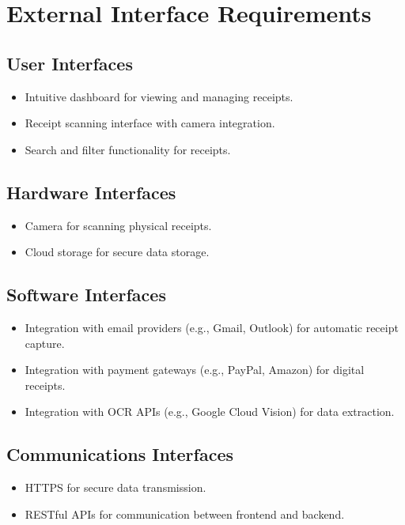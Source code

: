 \documentclass[12pt]{article}
\begin{document}
\section{External Interface Requirements}
\subsection{User Interfaces}
\begin{itemize}
    \item Intuitive dashboard for viewing and managing receipts.
    \item Receipt scanning interface with camera integration.
    \item Search and filter functionality for receipts.
\end{itemize}

\subsection{Hardware Interfaces}
\begin{itemize}
    \item Camera for scanning physical receipts.
    \item Cloud storage for secure data storage.
\end{itemize}

\subsection{Software Interfaces}
\begin{itemize}
    \item Integration with email providers (e.g., Gmail, Outlook) for automatic receipt capture.
    \item Integration with payment gateways (e.g., PayPal, Amazon) for digital receipts.
    \item Integration with OCR APIs (e.g., Google Cloud Vision) for data extraction.
\end{itemize}

\subsection{Communications Interfaces}
\begin{itemize}
    \item HTTPS for secure data transmission.
    \item RESTful APIs for communication between frontend and backend.
\end{itemize}
\end{document}
